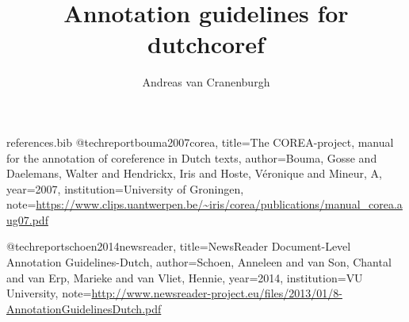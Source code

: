 \RequirePackage{filecontents}
\begin{filecontents}{references.bib}
@techreport{bouma2007corea,
  title={The COREA-project, manual for the annotation of coreference in Dutch texts},
  author={Bouma, Gosse and Daelemans, Walter and Hendrickx, Iris and Hoste, V{\'e}ronique and Mineur, A},
  year={2007},
  institution={University of Groningen},
  note={\url{https://www.clips.uantwerpen.be/~iris/corea/publications/manual_corea.aug07.pdf}}
}

@techreport{schoen2014newsreader,
  title={NewsReader Document-Level Annotation Guidelines-Dutch},
  author={Schoen, Anneleen and van Son, Chantal and van Erp, Marieke and van Vliet, Hennie},
  year={2014},
  institution={VU University},
  note={\url{http://www.newsreader-project.eu/files/2013/01/8-AnnotationGuidelinesDutch.pdf}}
} 
\end{filecontents}
\documentclass[a4paper]{article}
\usepackage[T1]{fontenc}
\usepackage[utf8]{inputenc}
\usepackage{kpfonts, mdwlist, microtype, xcolor, natbib}
\usepackage[unicode=true]{hyperref}
\setlength{\emergencystretch}{3em}  %
\newcommand{\n}[1]{\textcolor{red}{#1}}

\title{Annotation guidelines for dutchcoref}
\author{Andreas van Cranenburgh}
\date{}


\maketitle

\section{How to annotate?}

\begin{itemize*}
\item Read the text from start to finish, make and correct annotations as
  you go.
\item Identify mentions by asking yourself whether a span of text describes
  a specific identifiable object or person.
\item When the same entity is referred to again, ensure that both mentions
  are in the same coreference cluster. Conversely, remove any
  incorrect links.
\end{itemize*}

\section{Mentions}

